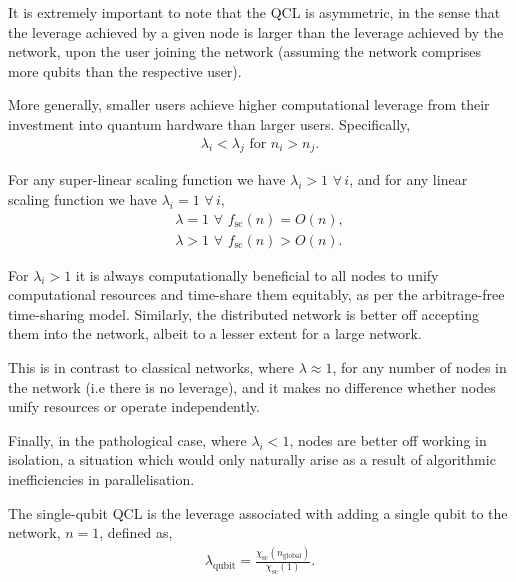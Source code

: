It is extremely important to note that the QCL is asymmetric, in the sense that the leverage achieved by a given node is larger than the leverage achieved by the network, upon the user joining the network (assuming the network comprises more qubits than the respective user).

More generally, smaller users achieve higher computational leverage from their investment into quantum hardware than larger users. Specifically,
\begin{align}
	\lambda_i<\lambda_j \,\,\text{for}\,\,n_i>n_j.
\end{align}

For any super-linear scaling function we have \mbox{$\lambda_i > 1 \,\,\forall \, i$}, and for any linear scaling function we have \mbox{$\lambda_i = 1 \,\,\forall \, i$},
\begin{align}
	\lambda=1\,\,\forall\,\,f_\text{sc}(n)=O(n), \nonumber \\
	\lambda>1\,\,\forall\,\,f_\text{sc}(n)>O(n).	
\end{align}

For \mbox{$\lambda_i>1$} it is always computationally beneficial to all nodes to unify computational resources and time-share them equitably, as per the arbitrage-free time-sharing model. Similarly, the distributed network is better off accepting them into the network, albeit to a lesser extent for a large network.

This is in contrast to classical networks, where \mbox{$\lambda\approx 1$}, for any number of nodes in the network (i.e there is no leverage), and it makes no difference whether nodes unify resources or operate independently.

Finally, in the pathological case, where \mbox{$\lambda_i<1$}, nodes are better off working in isolation, a situation which would only naturally arise as a result of algorithmic inefficiencies in parallelisation.

\begin{definition}
The single-qubit QCL is the leverage associated with adding a single qubit to the network, \mbox{$n=1$}, defined as,
\begin{align}
	\lambda_\text{qubit} = \frac{\chi_\text{sc}(n_\text{global})}{\chi_\text{sc}(1)}.
\end{align}
\end{definition}

